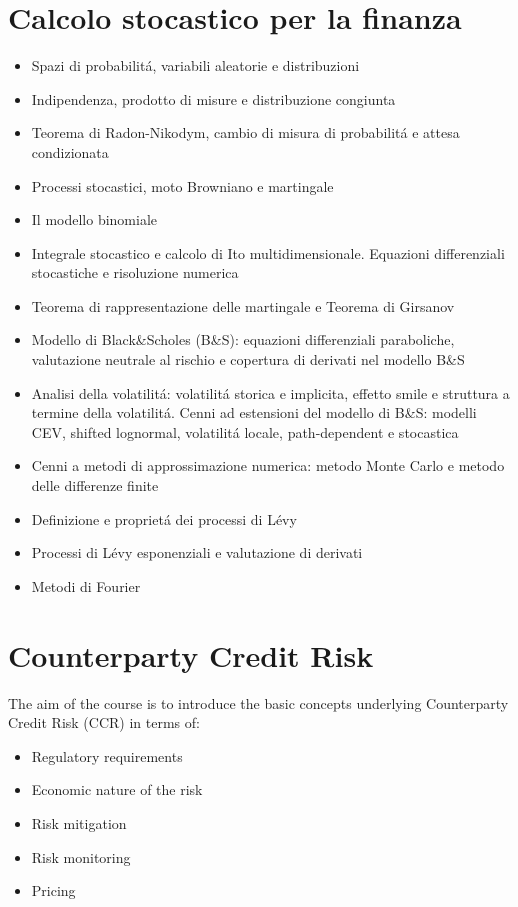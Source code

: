 \section{Calcolo stocastico per la finanza}
\begin{itemize}
	\item Spazi di probabilit\'{a}, variabili aleatorie e distribuzioni
	\item Indipendenza, prodotto di misure e distribuzione congiunta
	\item Teorema di Radon-Nikodym, cambio di misura di probabilit\'{a} e attesa condizionata
	\item Processi stocastici, moto Browniano e martingale
	\item Il modello binomiale
	\item Integrale stocastico e calcolo di Ito multidimensionale. Equazioni differenziali stocastiche e risoluzione numerica
	\item Teorema di rappresentazione delle martingale e Teorema di Girsanov
	\item Modello di Black\&Scholes (B\&S): equazioni differenziali paraboliche, valutazione neutrale al rischio e copertura di derivati nel modello B\&S
	\item Analisi della volatilit\'{a}: volatilit\'{a} storica e implicita, effetto smile e struttura a termine della volatilit\'{a}. Cenni ad estensioni del modello di B\&S: modelli CEV, shifted lognormal, volatilit\'{a} locale, path-dependent e stocastica
	\item Cenni a metodi di approssimazione numerica: metodo Monte Carlo e metodo delle differenze finite
	\item Definizione e propriet\'{a} dei processi di L\'{e}vy
	\item Processi di L\'{e}vy esponenziali e valutazione di derivati
	\item Metodi di Fourier
\end{itemize}

\section{Counterparty Credit Risk}
The aim of the course is to introduce the basic concepts underlying Counterparty Credit Risk (CCR) in terms of:

\begin{itemize}
	\item Regulatory requirements
	\item Economic nature of the risk
	\item Risk mitigation
	\item Risk monitoring
	\item Pricing
\end{itemize}


